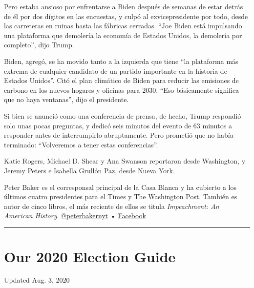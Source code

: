 Pero estaba ansioso por enfrentarse a Biden después de semanas de estar
detrás de él por dos dígitos en las encuestas, y culpó al
exvicepresidente por todo, desde las carreteras en ruinas hasta las
fábricas cerradas. ``Joe Biden está impulsando una plataforma que
demolería la economía de Estados Unidos, la demolería por completo'',
dijo Trump.

Biden, agregó, se ha movido tanto a la izquierda que tiene ``la
plataforma más extrema de cualquier candidato de un partido importante
en la historia de Estados Unidos''. Citó el plan climático de Biden para
reducir las emisiones de carbono en los nuevos hogares y oficinas para
2030. ``Eso básicamente significa que no haya ventanas'', dijo el
presidente.

Si bien se anunció como una conferencia de prensa, de hecho, Trump
respondió solo unas pocas preguntas, y dedicó seis minutos del evento de
63 minutos a responder antes de interrumpirlo abruptamente. Pero
prometió que no había terminado: ``Volveremos a tener estas
conferencias''.

Katie Rogers, Michael D. Shear y Ana Swanson reportaron desde
Washington, y Jeremy Peters e Isabella Grullón Paz, desde Nueva York.

Peter Baker es el corresponsal principal de la Casa Blanca y ha cubierto
a los últimos cuatro presidentes para el Times y The Washington Post.
También es autor de cinco libros, el más reciente de ellos se titula
\emph{Impeachment: An American History}.
\href{https://twitter.com/peterbakernyt}{@peterbakernyt} •
\href{https://www.facebook.com/peter.baker.351}{Facebook}

\begin{center}\rule{0.5\linewidth}{\linethickness}\end{center}

\hypertarget{our-2020-election-guide}{%
\section{Our 2020 Election Guide}\label{our-2020-election-guide}}

Updated Aug. 3, 2020

